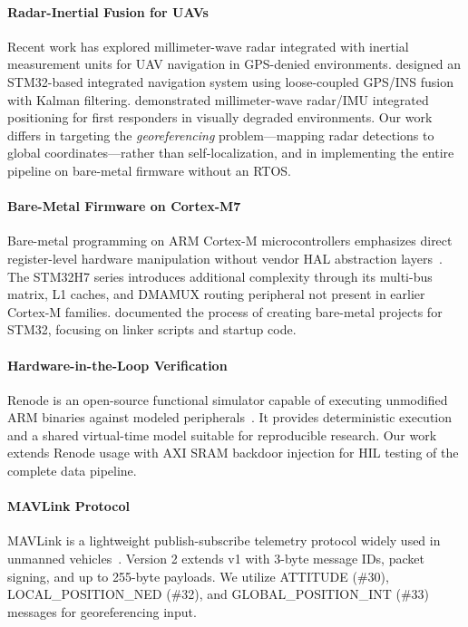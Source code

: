 \documentclass[conference,a4paper]{IEEEtran}
\begin{document}
\paragraph{Radar-Inertial Fusion for UAVs}
Recent work has explored millimeter-wave radar integrated with inertial measurement units for UAV navigation in GPS-denied environments. \cite{yiwei2025} designed an STM32-based integrated navigation system using loose-coupled GPS/INS fusion with Kalman filtering. \cite{smokenav2024} demonstrated millimeter-wave radar/IMU integrated positioning for first responders in visually degraded environments. Our work differs in targeting the \emph{georeferencing} problem---mapping radar detections to global coordinates---rather than self-localization, and in implementing the entire pipeline on bare-metal firmware without an RTOS.

\paragraph{Bare-Metal Firmware on Cortex-M7}
Bare-metal programming on ARM Cortex-M microcontrollers emphasizes direct register-level hardware manipulation without vendor HAL abstraction layers~\cite{barr2006,yiu2014}. The STM32H7 series introduces additional complexity through its multi-bus matrix, L1 caches, and DMAMUX routing peripheral not present in earlier Cortex-M families. \cite{deslabstm32} documented the process of creating bare-metal projects for STM32, focusing on linker scripts and startup code.

\paragraph{Hardware-in-the-Loop Verification}
Renode is an open-source functional simulator capable of executing unmodified ARM binaries against modeled peripherals~\cite{renode}. It provides deterministic execution and a shared virtual-time model suitable for reproducible research. Our work extends Renode usage with AXI SRAM backdoor injection for HIL testing of the complete data pipeline.

\paragraph{MAVLink Protocol}
MAVLink is a lightweight publish-subscribe telemetry protocol widely used in unmanned vehicles~\cite{mavlink}. Version 2 extends v1 with 3-byte message IDs, packet signing, and up to 255-byte payloads. We utilize ATTITUDE (\#30), LOCAL\_POSITION\_NED (\#32), and GLOBAL\_POSITION\_INT (\#33) messages for georeferencing input.
\end{document}
